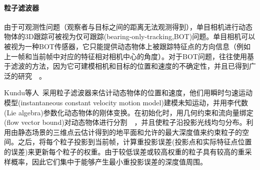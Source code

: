 \paragraph{粒子滤波器}
由于可观测性问题（观察者与目标之间的距离无法观测得到），单目相机进行动态物体的3D跟踪可被视为仅可跟踪(bearing-only-tracking,BOT)问题。单目相机可以被视为一种BOT传感器，它只能提供动态物体上被跟踪特征点的方向信息（例如上一帧和当前帧中对应的特征相对相机中心的角度）。对于BOT问题，往往使用基于滤波的方法，因为它可建模相机和目标的位置和速度的不确定性，并且已得到广泛的研究~\cite{aidala1983utilization}~\cite{le1998bearings}。

Kundu等人~\cite{kundu2011realtime}采用粒子滤波器来估计动态物体的位置和速度，他们用瞬时匀速运动模型(instantaneous constant velocity motion model)建模未知运动，并用李代数(Lie algebra)参数化动态物体的刚体变换。在初始化时，用几何约束和流向量绑定(flow vector bound)对动态物体进行分割~\cite{kundu2009moving}~\cite{kundu2010realtime}，并且使粒子沿投影光线均匀分布。利用由静态场景的三维点云估计得到的地平面和允许的最大深度值来约束粒子的空间。之后，将每个粒子投影到当前帧，计算重投影误差(投影点和实际特征点位置的误差)来更新每个粒子的权重。由于较低误差或较高权重的粒子具有较高的重采样概率，因此它们集中于能够产生最小重投影误差的深度值周围。


